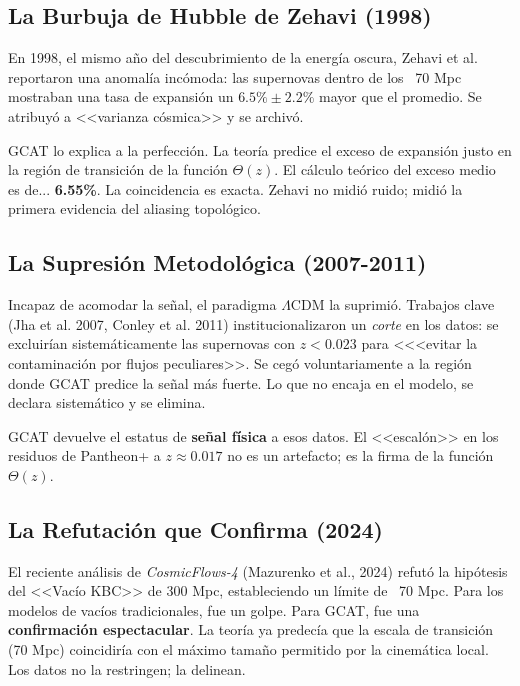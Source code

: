 \documentclass[12pt, a4paper]{article}
\begin{document}
\subsection{La Burbuja de Hubble de Zehavi (1998)}

En 1998, el mismo año del descubrimiento de la energía oscura, Zehavi et al. reportaron una anomalía incómoda: las supernovas dentro de los ~70 Mpc mostraban una tasa de expansión un $6.5\% \pm 2.2\%$ mayor que el promedio. Se atribuyó a <<varianza cósmica>> y se archivó.

GCAT lo explica a la perfección. La teoría predice el exceso de expansión justo en la región de transición de la función $\Theta(z)$. El cálculo teórico del exceso medio es de... \textbf{6.55\%}. La coincidencia es exacta. Zehavi no midió ruido; midió la primera evidencia del aliasing topológico.

\subsection{La Supresión Metodológica (2007-2011)}

Incapaz de acomodar la señal, el paradigma $\Lambda$CDM la suprimió. Trabajos clave (Jha et al. 2007, Conley et al. 2011) institucionalizaron un \textit{corte} en los datos: se excluirían sistemáticamente las supernovas con $z < 0.023$ para <<<evitar la contaminación por flujos peculiares>>. Se cegó voluntariamente a la región donde GCAT predice la señal más fuerte. Lo que no encaja en el modelo, se declara sistemático y se elimina.

GCAT devuelve el estatus de \textbf{señal física} a esos datos. El <<escalón>> en los residuos de Pantheon+ a $z \approx 0.017$ no es un artefacto; es la firma de la función $\Theta(z)$.

\subsection{La Refutación que Confirma (2024)}

El reciente análisis de \textit{CosmicFlows-4} (Mazurenko et al., 2024) refutó la hipótesis del <<Vacío KBC>> de 300 Mpc, estableciendo un límite de ~70 Mpc. Para los modelos de vacíos tradicionales, fue un golpe. Para GCAT, fue una \textbf{confirmación espectacular}. La teoría ya predecía que la escala de transición (70 Mpc) coincidiría con el máximo tamaño permitido por la cinemática local. Los datos no la restringen; la delinean.

\end{document}

